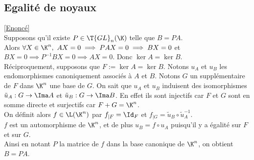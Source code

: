 \documentclass[8pt]{book}
\begin{document}
	\subsection{Egalité de noyaux }
	\label{Egalité de noyaux corrigé}
	\textcolor{blue}{\hyperref[Egalité de noyaux]{[Enoncé]}}\\
	Supposons qu'il existe $P\in \T{GL}_n(\K)$ telle que $B=PA$.\\
	Alors $\forall X\in \K^n,\ AX=0\implies PAX=0\implies BX=0$ et $BX=0\implies P^{-1}BX=0\implies AX=0$. Donc $\ker A=\ker B$.\\
	Réciproquement, supposons que $F:=\ker A=\ker B$. Notons $u_A$ et $u_B$ les endomorphismes canoniquement associés à $A$ et $B$. Notons $G$ un supplémentaire de $F$ dans $\K^n$ une base de $G$. On sait que $u_A$ et $u_B$ induisent des isomorphismes $\tilde u_A:G\to \Ima A$ et $\tilde u_B:G\to \Ima B$. En effet ils sont injectifs car $F$ et $G$ sont en somme directe et surjectifs car $F+G=\K^n$.\\
	On définit alors $f\in \L(\K^n)$ par $f_{|F}=\Id_F$ et $f_{|G}=\tilde u_B\circ \tilde u_A^{-1}$.\\
	$f$ est un automorphisme de $\K^n$, et de plus $u_B=f\circ u_A$ puisqu'il y a égalité sur $F$ et sur $G$.\\
	Ainsi en notant $P$ la matrice de $f$ dans la base canonique de $\K^n$, on obtient $B=PA$.
	
\end{document}
